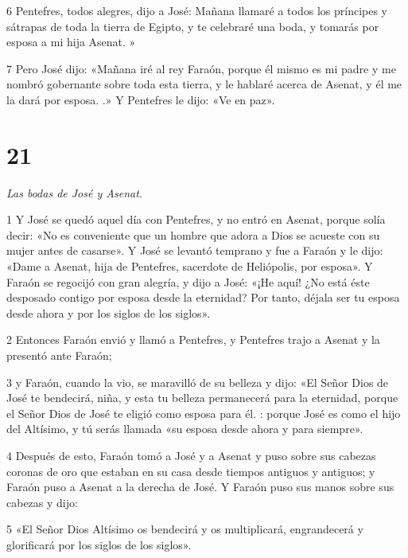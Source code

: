 \par 6 Pentefres, todos alegres, dijo a José: Mañana llamaré a todos los príncipes y sátrapas de toda la tierra de Egipto, y te celebraré una boda, y tomarás por esposa a mi hija Asenat. »

\par 7 Pero José dijo: «Mañana iré al rey Faraón, porque él mismo es mi padre y me nombró gobernante sobre toda esta tierra, y le hablaré acerca de Asenat, y él me la dará por esposa. .» Y Pentefres le dijo: «Ve en paz».

\chapter{21}

\par \textit{Las bodas de José y Asenat.}

\par 1 Y José se quedó aquel día con Pentefres, y no entró en Asenat, porque solía decir: «No es conveniente que un hombre que adora a Dios se acueste con su mujer antes de casarse». Y José se levantó temprano y fue a Faraón y le dijo: «Dame a Asenat, hija de Pentefres, sacerdote de Heliópolis, por esposa». Y Faraón se regocijó con gran alegría, y dijo a José: «¡He aquí! ¿No está éste desposado contigo por esposa desde la eternidad? Por tanto, déjala ser tu esposa desde ahora y por los siglos de los siglos».

\par 2 Entonces Faraón envió y llamó a Pentefres, y Pentefres trajo a Asenat y la presentó ante Faraón;

\par 3 y Faraón, cuando la vio, se maravilló de su belleza y dijo: «El Señor Dios de José te bendecirá, niña, y esta tu belleza permanecerá para la eternidad, porque el Señor Dios de José te eligió como esposa para él. : porque José es como el hijo del Altísimo, y tú serás llamada «su esposa desde ahora y para siempre».

\par 4 Después de esto, Faraón tomó a José y a Asenat y puso sobre sus cabezas coronas de oro que estaban en su casa desde tiempos antiguos y antiguos; y Faraón puso a Asenat a la derecha de José. Y Faraón puso sus manos sobre sus cabezas y dijo:

\par 5 «El Señor Dios Altísimo os bendecirá y os multiplicará, engrandecerá y glorificará por los siglos de los siglos».

